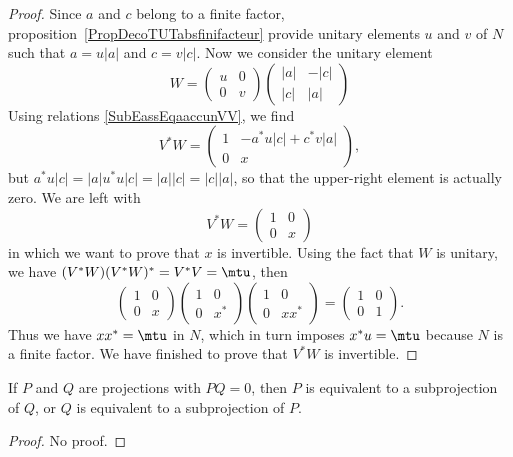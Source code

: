 \begin{proof}
Since $a$ and $c$ belong to a finite factor, proposition~\ref{PropDecoTUTabsfinifacteur} provide unitary elements $u$ and $v$ of $N$ such that $a=u| a |$ and $c=v| c |$. Now we consider the unitary element
\[
  W=
\begin{pmatrix}
u&0\\
0&v
\end{pmatrix}
\begin{pmatrix}
| a |&-| c |\\
| c |&| a |
\end{pmatrix}
\]
Using relations \eqref{SubEassEqaaccunVV}, we find
\[
  V^*W=
\begin{pmatrix}
1	&	-a^*u| c |+c^*v| a |\\
0	&	x
\end{pmatrix},
\]
but $a^*u| c |=| a |u^*u| c |=| a | | c |=| c | |a |$, so that the upper-right element is actually zero. We are left with
\[
  V^*W=
\begin{pmatrix}
1	&0\\
0	&x
\end{pmatrix}
\]
in which we want to prove that $x$ is invertible. Using the fact that $W$ is unitary, we have $(V^*W)(V^*W)^*=V^*V=\mtu$, then
\[
  \begin{pmatrix}
1	&	0\\
0	&	x
\end{pmatrix}
  \begin{pmatrix}
1	&	0\\
0	&	x^*
\end{pmatrix}
  \begin{pmatrix}
1	&	0\\
0	&	xx^*
\end{pmatrix}
=
  \begin{pmatrix}
1	&	0\\
0	&	1
\end{pmatrix}.
\]
Thus we have $xx^*=\mtu$ in $N$, which in turn imposes $x^*u=\mtu$ because $N$ is a finite factor. We have finished to prove that $V^*W$ is invertible.
\end{proof}

\begin{lemma}
If $P$ and $Q$ are projections with $PQ=0$, then $P$ is equivalent to a subprojection of $Q$, or $Q$ is equivalent to a subprojection of $P$.
\end{lemma}
\begin{proof}
No proof.
\end{proof}

